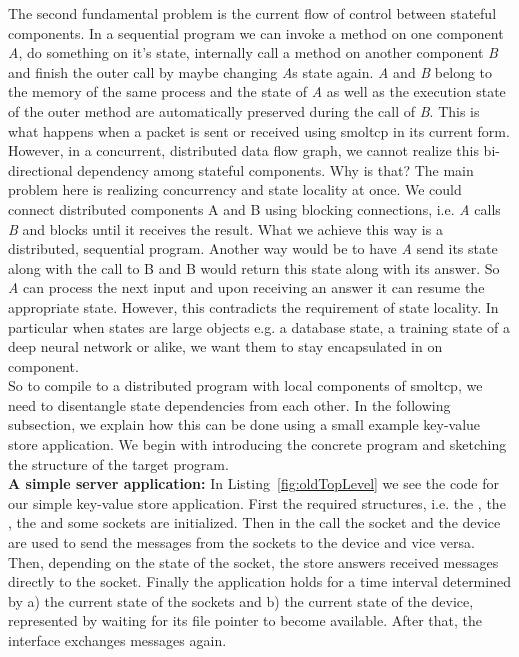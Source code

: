 The second fundamental problem is the current flow of control between stateful components. In a sequential program we can invoke a method on one component \emph{A}, do something on it's state, internally call a method on another component \emph{B} and finish the outer call by maybe changing \emph{A}s state again. \emph{A} and \emph{B} belong to the memory of the same process and the state of \emph{A} as well as the execution state of the outer method are automatically preserved during the call of \emph{B}.
This is what happens when a packet is sent or received using smoltcp in its current form. However, in a concurrent, distributed data flow graph, we cannot realize this bi-directional dependency among stateful components. Why is that? The main problem here is realizing concurrency and state locality at once. We could connect distributed components A and B using blocking connections, i.e. \emph{A} calls \emph{B} and blocks until it receives the result. What we achieve this way is a distributed, sequential program. Another way would be to have \emph{A} send its state along with the call to B and B would return this state along with its answer. So \emph{A} can process the next input and upon receiving an answer it can resume the appropriate state. However, this contradicts the requirement of state locality. In particular when states are large objects e.g. a database state, a training state of a deep neural network or alike, we want them to stay encapsulated in on component.\\

So to compile to a distributed program with local components of smoltcp, we need to disentangle state dependencies from each other. In the following subsection, we explain how this can be done using a small example key-value store application. We begin with introducing the concrete program and sketching the structure of the target program.\\

\textbf{A simple server application: } In Listing~\ref{fig:oldTopLevel} we see the code for our simple key-value store application. First the required structures, i.e. the , the , the  and some sockets are initialized. Then in the  call the socket and the device are used to send the messages from the sockets to the device and vice versa. Then, depending on the state of the socket, the store answers received messages directly to the socket. Finally the application holds for a time interval determined by a) the current state of the sockets  and b) the current state of the device, represented by waiting for its file pointer  to become available. After that, the interface exchanges messages again.


